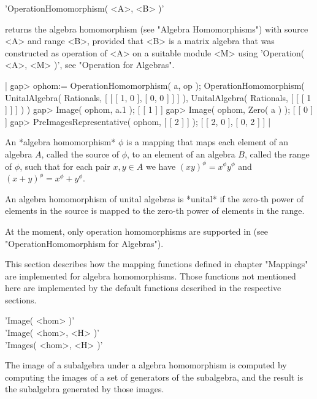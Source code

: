 
'OperationHomomorphism( <A>, <B> )'

returns the algebra homomorphism (see "Algebra Homomorphisms") with
source <A> and range <B>, provided that <B> is a matrix algebra that was
constructed as operation of <A> on a suitable module <M> using
'Operation( <A>, <M> )', see "Operation for Algebras".

|    gap> ophom:= OperationHomomorphism( a, op );
    OperationHomomorphism( UnitalAlgebra( Rationals,
    [ [ [ 1, 0 ], [ 0, 0 ] ] ] ), UnitalAlgebra( Rationals,
    [ [ [ 1 ] ] ] ) )
    gap> Image( ophom, a.1 );
    [ [ 1 ] ]
    gap> Image( ophom, Zero( a ) );
    [ [ 0 ] ]
    gap> PreImagesRepresentative( ophom, [ [ 2 ] ] );
    [ [ 2, 0 ], [ 0, 2 ] ] |

%

An *algebra homomorphism* $\phi$ is a mapping that maps each element of an
algebra $A$, called the source of $\phi$, to an element of an algebra $B$,
called the range of $\phi$, such that for each pair $x, y \in A$ we have
$(xy)^\phi = x^\phi y^\phi$ and $(x + y)^\phi = x^\phi + y^\phi$.

An algebra homomorphism of unital algebras is *unital* if the zero-th
power of elements in the source is mapped to the zero-th power of elements
in the range.

At the moment, only operation homomorphisms are supported in {\GAP} (see
"OperationHomomorphism for Algebras").


This section describes how the mapping functions defined in chapter
"Mappings" are implemented for algebra homomorphisms. Those functions not
mentioned here are implemented by the default functions described in the
respective sections.

\vspace{5mm}
'Image( <hom> )' \\
'Image( <hom>, <H> )' \\
'Images( <hom>, <H> )'

The image of a subalgebra under a algebra  homomorphism is computed by
computing the images of a set of generators of the subalgebra, and the
result is the subalgebra generated by those images.


